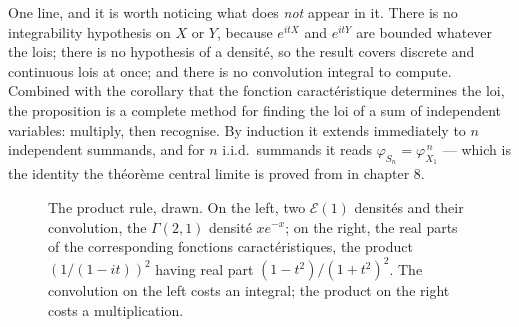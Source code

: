\begin{remark}
One line, and it is worth noticing what does \emph{not} appear in it. There is no
integrability hypothesis on $X$ or $Y$, because $e^{itX}$ and $e^{itY}$ are bounded whatever
the lois; there is no hypothesis of a densité, so the result covers discrete and continuous
lois at once; and there is no convolution integral to compute. Combined with the corollary
that the fonction caractéristique determines the loi, the proposition is a complete method
for finding the loi of a sum of independent variables: multiply, then recognise. By
induction it extends immediately to $n$ independent summands, and for $n$ i.i.d.\ summands
it reads $\varphi_{S_{n}} = \varphi_{X_{1}}^{\,n}$ --- which is the identity the théorème
central limite is proved from in chapter 8.
\end{remark}

\begin{figure}[ht]
\centering
{}
\caption{The product rule, drawn. On the left, two $\mathcal{E}(1)$ densités
and their convolution, the $\Gamma(2,1)$ densité $x e^{-x}$; on the right, the real parts of
the corresponding fonctions caractéristiques, the product $\left(1/(1-it)\right)^{2}$ having
real part $(1-t^{2})/(1+t^{2})^{2}$. The convolution on the left costs an integral; the
product on the right costs a multiplication.}
\end{figure}

